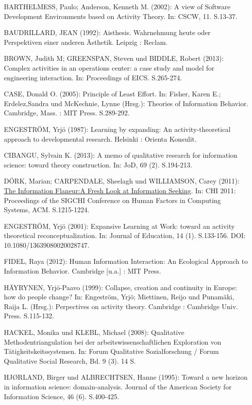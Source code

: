 \documentclass[a4paper,
fontsize=11pt,
oneside,
numbers=noperiodatend,
parskip=half-,
bibliography=totoc,
final
]{scrartcl}
\begin{document}
BARTHELMESS, Paulo; Anderson, Kenneth M. (2002): A view of Software
Development Environments based on Activity Theory. In: CSCW, 11.
S.13-37.

BAUDRILLARD, JEAN (1992): Aisthesis. Wahrnehmung heute oder Perspektiven
einer anderen Ästhetik. Leipzig : Reclam.

BROWN, Judith M; GREENSPAN, Steven und BIDDLE, Robert (2013): Complex
activities in an operations center: a case study and model for
engineering interaction. In: Proceedings of EICS. S.265-274.

CASE, Donald O. (2005): Principle of Least Effort. In: Fisher, Karen E.;
Erdelez,Sandra und McKechnie, Lynne (Hrsg.): Theories of Information
Behavior. Cambridge, Mass. : MIT Press. S.289-292.

ENGESTRÖM, Yrjö (1987): Learning by expanding: An activity-theoretical
approach to developmental research. Helsinki : Orienta Konsulit.

CIBANGU, Sylvain K. (2013): A memo of qualitative research for
information science: toward theory construction. In: JoD, 69 (2).
S.194-213.

DÖRK, Marian; CARPENDALE, Sheelagh und WILLIAMSON, Carey (2011):
\href{http://mariandoerk.de/informationflaneur/chi2011.pdf}{The
Information
Flaneur:}\href{http://mariandoerk.de/informationflaneur/chi2011.pdf}{A
Fresh Look at Information Seeking}. In: CHI 2011: Proceedings of the
SIGCHI Conference on Human Factors in Computing Systems, ACM.
S.1215-1224.

ENGESTRÖM, Yrjö (2001): Expansive Learning at Work: toward an activity
theoretical reconceptualization. In: Journal of Education, 14 (1).
S.133-156. DOI: 10.1080/13639080020028747.

FIDEL, Raya (2012): Human Information Interaction: An Ecological
Approach to Information Behavior. Cambridge {[}u.a.{]} : MIT Press.

HÄYRYNEN, Yrjö-Paavo (1999): Collapse, creation and continuity in
Europe: how do people change? In: Engeström, Yrjö; Miettinen, Reijo und
Punamäki, Raija L. (Hrsg.): Perpectives on activity theory. Cambridge :
Cambridge Univ. Press. S.115-132.

HACKEL, Monika und KLEBL, Michael (2008): Qualitative
Methodentriangulation bei der arbeitswissenschaftlichen Exploration von
Tätigkeitskeitssystemen. In: Forum Qualitative Sozialforschung / Forum
Qualitative Social Research, Bd. 9 (3). 14 S.

HJØRLAND, Birger und ALBRECHTSEN, Hanne (1995): Toward a new horizon in
information science: domain-analysis. Journal of the American Society
for Information Science, 46 (6). S.400-425.
\end{document}
